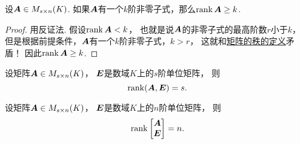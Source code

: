 \begin{theorem}
设\(\boldsymbol{A}\in M_{s \times n}(K)\).
如果\(\boldsymbol{A}\)有一个\(k\)阶非零子式，那么\(\rank\boldsymbol{A}\geq k\).
\begin{proof}
用反证法.
假设\(\rank\boldsymbol{A}<k\)，
也就是说\(\boldsymbol{A}\)的非零子式的最高阶数\(r\)小于\(k\)，
但是根据前提条件，\(\boldsymbol{A}\)有一个\(k\)阶非零子式，\(k>r\)，
这就和\hyperref[definition:线性方程组.矩阵的秩的定义]{矩阵的秩的定义}矛盾！
因此\(\rank\boldsymbol{A}\geq k\).
\end{proof}
\end{theorem}
\begin{corollary}
设矩阵\(\boldsymbol{A} \in M_{s \times n}(K)\)，
\(\boldsymbol{E}\)是数域\(K\)上的\(s\)阶单位矩阵，
则\begin{equation*}
	\rank(\boldsymbol{A},\boldsymbol{E}) = s.
\end{equation*}
\end{corollary}
\begin{corollary}
设矩阵\(\boldsymbol{A} \in M_{s \times n}(K)\)，
\(\boldsymbol{E}\)是数域\(K\)上的\(n\)阶单位矩阵，
则\begin{equation*}
	\rank\begin{bmatrix}
		\boldsymbol{A} \\ \boldsymbol{E}
	\end{bmatrix}
	= n.
\end{equation*}
\end{corollary}

